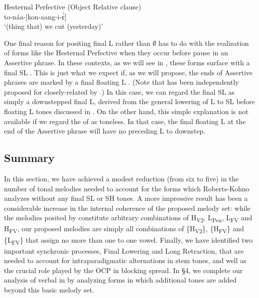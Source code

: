 \documentclass[output=paper,newtxmath,modfonts,nonflat,hidelinks]{langsci/langscibook}
\begin{document}
\ea\label{ex:jones:8}
Hesternal Perfective (Object Relative clause)\\
 to-náa-[kon-aang-i-\`ɛ]  \\
\glt ‘(thing that) we cut (yesterday)’
\z

One final reason for positing final L rather than ${\emptyset}$ has to do with the realization of forms like the Hesternal Perfective when they occur before pause in an Assertive phrase. In these contexts, as we will see in , these forms surface with a final SL . This is just what we expect if, as we will propose, the ends of Assertive phrases are marked by a final floating L . (Note that has been independently proposed for closely-related  by \citealt{Gjersoe2016}.) In this case, we can regard the final SL  as simply a downstepped final L, derived from the general lowering of L to SL before floating L tones discussed in . On the other hand, this simple explanation is not available if we regard the  of  as toneless. In that case, the final floating L  at the end of the {Assertive phrase} will have no preceding L  to downstep.

\subsection{Summary}\label{sec:jones:3.7}

In this section, we have achieved a modest reduction (from six to five) in the number of tonal melodies needed to account for the forms which Roberts-Kohno analyzes without any final SL or SH tones. A more impressive result has been a considerable increase in the internal coherence of the proposed melody set: while the melodies posited by \citet{Roberts-Kohno2014} constitute arbitrary combinations of H\textsubscript{V2}, L\textsubscript{Pen}, L\textsubscript{FV} and H\textsubscript{FV}, our proposed melodies are simply all combinations of \{H\textsubscript{V2}\}, \{H\textsubscript{FV}\} and \{L\textsubscript{FV}\} that assign no more than one  to one vowel. Finally, we have identified two important synchronic processes, Final Lowering and Long Retraction, that are needed to account for intraparadigmatic alternations in stem tones, and well as the crucial role played by the OCP in blocking  spread. In §4, we complete our analysis of verbal  in  by analyzing forms in which additional tones are added beyond this basic melody set.
\end{document}

